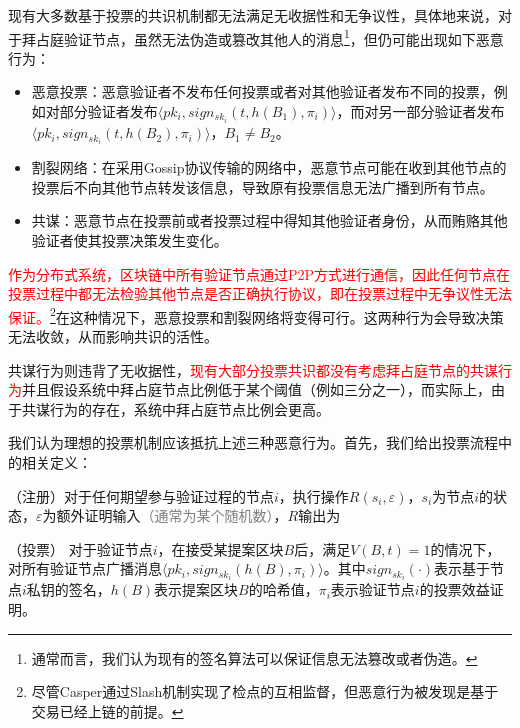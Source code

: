 现有大多数基于投票的共识机制都无法满足无收据性和无争议性，具体地来说，对于拜占庭验证节点，虽然无法伪造或篡改其他人的消息\footnote{通常而言，我们认为现有的签名算法可以保证信息无法篡改或者伪造。}，但仍可能出现如下恶意行为：

\begin{itemize}
	\item 恶意投票：恶意验证者不发布任何投票或者对其他验证者发布不同的投票，例如对部分验证者发布$\langle pk_i,sign_{sk_i}(t,h(B_1),\pi_i) \rangle$，而对另一部分验证者发布$\langle pk_i,sign_{sk_i}(t,h(B_2),\pi_i) \rangle$，$B_1 \neq B_2$。
	\item 割裂网络：在采用Gossip协议传输的网络中，恶意节点可能在收到其他节点的投票后不向其他节点转发该信息，导致原有投票信息无法广播到所有节点。
	\item 共谋：恶意节点在投票前或者投票过程中得知其他验证者身份，从而贿赂其他验证者使其投票决策发生变化。
\end{itemize}

\textcolor{red}{作为分布式系统，区块链中所有验证节点通过P2P方式进行通信，因此任何节点在投票过程中都无法检验其他节点是否正确执行协议，即在投票过程中无争议性无法保证。}\footnote{尽管Casper通过Slash机制实现了检点的互相监督，但恶意行为被发现是基于交易已经上链的前提。}在这种情况下，恶意投票和割裂网络将变得可行。这两种行为会导致决策无法收敛，从而影响共识的活性。%

共谋行为则违背了无收据性，\textcolor{red}{现有大部分投票共识都没有考虑拜占庭节点的共谋行为}并且假设系统中拜占庭节点比例低于某个阈值（例如三分之一），而实际上，由于共谋行为的存在，系统中拜占庭节点比例会更高。

我们认为理想的投票机制应该抵抗上述三种恶意行为。首先，我们给出投票流程中的相关定义：

\begin{definition}
	（注册）对于任何期望参与验证过程的节点$i$，执行操作$R(s_i,\varepsilon)$，$s_i$为节点$i$的状态，$\varepsilon$为额外证明输入\textcolor{gray}{（通常为某个随机数）}，$R$输出为
\end{definition}

\begin{definition}
（投票） 对于验证节点$i$，在接受某提案区块$B$后，满足$V(B,t)=1$的情况下，对所有验证节点广播消息$\langle pk_i,sign_{sk_i}(h(B),\pi_i) \rangle$。其中$sign_{sk_i}(\cdot)$表示基于节点$i$私钥的签名，$h(B)$表示提案区块$B$的哈希值，$\pi_i$表示验证节点$i$的投票效益证明。
\end{definition}

